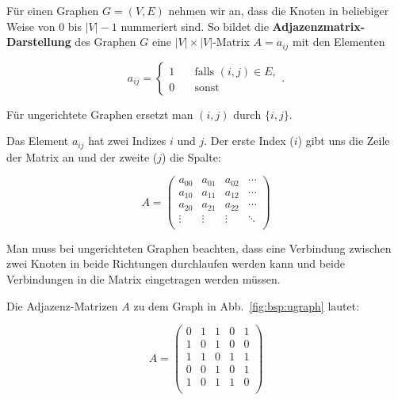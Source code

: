 \begin{mdef}
Für einen Graphen $G=(V,E)$ nehmen wir an, dass die Knoten in beliebiger Weise von 0 bis $|V|-1$ nummeriert sind.
So bildet die \textbf{Adjazenzmatrix-Darstellung} des Graphen $G$ eine $|V| \times |V|$-Matrix $A=a_{ij}$ mit den Elementen

\[ a_{ij} = 
  \begin{cases}
    1   & \quad \text{falls } (i,j) \in E, \\
   0   & \quad \text{sonst}
  \end{cases}.
\]

Für ungerichtete Graphen ersetzt man $(i,j) \text{ durch } \{i,j\}$.
\end{mdef}

Das Element $a_{ij}$ hat zwei Indizes $i$ und $j$. Der erste Index ($i$) gibt uns die Zeile der Matrix an und der zweite ($j$) die Spalte:

\[
A = \begin{pmatrix}
  a_{00} & a_{01} & a_{02} & \cdots \\
  a_{10} & a_{11} & a_{12} & \cdots \\
  a_{20} & a_{21} & a_{22} & \cdots \\
  \vdots & \vdots & \vdots & \ddots \\
\end{pmatrix}
\]

Man muss bei ungerichteten Graphen beachten, dass eine Verbindung zwischen zwei Knoten in beide Richtungen durchlaufen werden kann und beide Verbindungen in die Matrix eingetragen werden müssen. 

\begin{mbsp}
Die Adjazenz-Matrizen $A$ zu dem Graph in Abb.~\ref{fig:bsp:ugraph} lautet:

\[ A =  \begin{pmatrix}
  0 & 1 & 1 & 0 & 1 \\
  1 & 0 & 1 & 0 & 0 \\
  1 & 1 & 0 & 1 & 1  \\
  0 & 0 & 1 & 0 & 1 \\
  1 & 0 & 1 & 1 & 0 \\
 \end{pmatrix}
\]
\end{mbsp}


